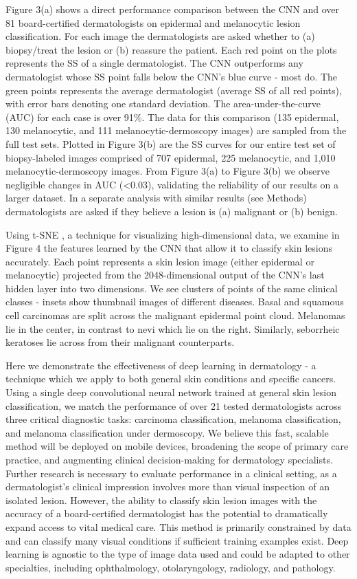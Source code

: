 Figure 3(a) shows a direct performance comparison between the CNN and over 81 board-certified dermatologists on epidermal and melanocytic lesion classification. For each image the dermatologists are asked whether to (a) biopsy/treat the lesion or (b) reassure the patient. Each red point on the plots represents the SS of a single dermatologist. The CNN outperforms any dermatologist whose SS point falls below the CNN’s blue curve - most do. The green points represents the average dermatologist (average SS of all red points), with error bars denoting one standard deviation. The area-under-the-curve (AUC) for each case is over 91\%. The data for this comparison (135 epidermal, 130 melanocytic, and 111 melanocytic-dermoscopy images) are sampled from the full test sets. Plotted in Figure 3(b) are the SS curves for our entire test set of biopsy-labeled images comprised of 707 epidermal, 225 melanocytic, and 1,010 melanocytic-dermoscopy images. From Figure 3(a) to Figure 3(b) we observe negligible changes in AUC (<0.03), validating the reliability of our results on a larger dataset. In a separate analysis with similar results (see Methods) dermatologists are asked if they believe a lesion is (a) malignant or (b) benign.

Using t-SNE \cite{van2008visualizing}, a technique for visualizing high-dimensional data, we examine in Figure 4 the features learned by the CNN that allow it to classify skin lesions accurately. Each point represents a skin lesion image (either epidermal or melanocytic) projected from the 2048-dimensional output of the CNN’s last hidden layer into two dimensions.   We see clusters of points of the same clinical classes - insets show thumbnail images of different diseases. Basal and squamous cell carcinomas are split across the malignant epidermal point cloud. Melanomas lie in the center, in contrast to nevi which lie on the right. Similarly, seborrheic keratoses lie across from their malignant counterparts. 

Here we demonstrate the effectiveness of deep learning in dermatology -  a technique which we apply to both general skin conditions and specific cancers. Using a single deep convolutional neural network trained at general skin lesion classification, we match the performance of over 21 tested dermatologists across three critical diagnostic tasks: carcinoma classification, melanoma classification, and melanoma classification under dermoscopy. We believe this fast, scalable method will be deployed on mobile devices, broadening the scope of primary care practice, and augmenting clinical decision-making for dermatology specialists. Further research is necessary to evaluate performance in a clinical setting, as a dermatologist’s clinical impression involves more than visual inspection of an isolated lesion. However, the ability to classify skin lesion images with the accuracy of a board-certified dermatologist has the potential to dramatically expand access to vital medical care. This method is primarily constrained by data and can classify many visual conditions if sufficient training examples exist. Deep learning is agnostic to the type of image data used and could be adapted to other specialties, including ophthalmology, otolaryngology, radiology, and pathology. 

